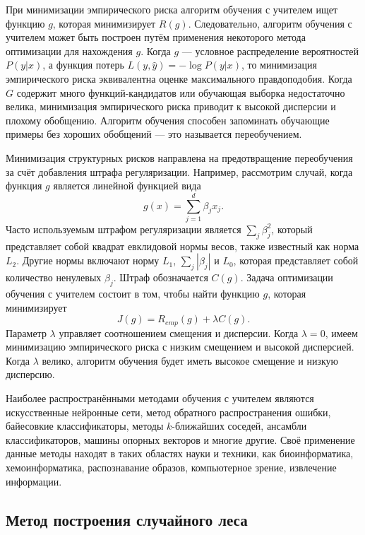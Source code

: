 При минимизации эмпирического риска алгоритм обучения с учителем ищет функцию $g$, которая минимизирует $R (g)$. Следовательно, алгоритм обучения с учителем может быть построен путём применения некоторого метода оптимизации для нахождения $g$. Когда $g$ --- условное распределение вероятностей $P (y | x)$, а функция потерь $L(y, \hat{y}) = -\log P(y | x)$, то минимизация эмпирического риска эквивалентна оценке максимального правдоподобия. Когда $G$ содержит много функций-кандидатов или обучающая выборка недостаточно велика, минимизация эмпирического риска приводит к высокой дисперсии и плохому обобщению. Алгоритм обучения способен запоминать обучающие примеры без хороших обобщений --- это называется переобучением.

Минимизация структурных рисков направлена на предотвращение переобучения за счёт добавления штрафа регуляризации. Например, рассмотрим случай, когда функция $g$ является линейной функцией вида
\begin{equation}
\label{eq:sup_learn_risk}
g(x) = \sum_{j = 1}^d \beta_j x_j.
\end{equation}
Часто используемым штрафом регуляризации является $\sum_j \beta_j^2$, который представляет собой квадрат евклидовой нормы весов, также известный как норма $L_{2}$. Другие нормы включают норму $L_{1}$, $\sum_j |\beta_j|$ и $L_{0}$, которая представляет собой количество ненулевых $\beta_{j}$. Штраф обозначается $C (g)$. Задача оптимизации обучения с учителем состоит в том, чтобы найти функцию $g$, которая минимизирует
\begin{equation}
\label{eq:sup_learn_opt}
J(g) = R_{emp}(g) + \lambda C(g).
\end{equation}
Параметр $\lambda$ управляет соотношением смещения и дисперсии. Когда $\lambda = 0$, имеем минимизацию эмпирического риска с низким смещением и высокой дисперсией. Когда $\lambda$ велико, алгоритм обучения будет иметь высокое смещение и низкую дисперсию. 

Наиболее распространёнными методами обучения с учителем являются искусственные нейронные сети, метод обратного распространения ошибки, байесовкие классификаторы, методы $k$-ближайших соседей, ансамбли классификаторов, машины опорных векторов и многие другие. Своё применение данные методы находят в таких областях науки и техники, как биоинформатика, хемоинформатика, распознавание образов, компьютерное зрение, извлечение информации. 

\subsection{Метод построения случайного леса}\label{subsec:ch1/sec2/subsec3}

